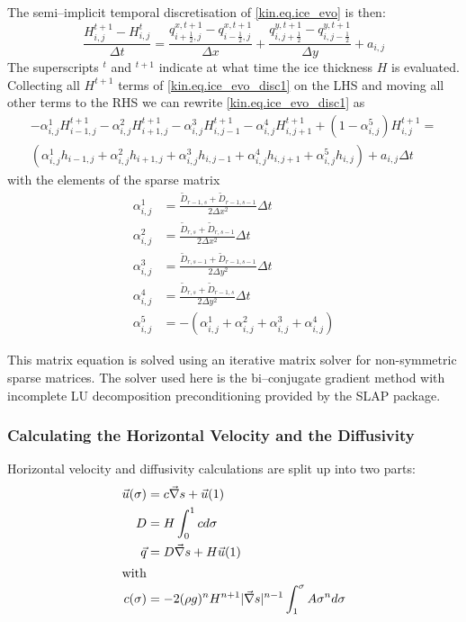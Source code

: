 The semi--implicit temporal discretisation of \eqref{kin.eq.ice_evo} is then:
\begin{equation}
\label{kin.eq.ice_evo_disc1}
  \frac{H^{t+1}_{i,j}-H^t_{i,j}}{\Delta t}=\frac{q^{x,t+1}_{i+\frac12,j}-q^{x,t+1}_{i-\frac12,j}}{\Delta x}+\frac{q^{y,t+1}_{i,j+\frac12}-q^{y,t+1}_{i,j-\frac12}}{\Delta y} + a_{i,j}
\end{equation}
The superscripts $^t$ and $^{t+1}$ indicate at what time the ice thickness $H$ is evaluated. Collecting all $H^{t+1}$ terms of \eqref{kin.eq.ice_evo_disc1} on the LHS and moving all other terms to the RHS we can rewrite \eqref{kin.eq.ice_evo_disc1} as
\begin{multline}
  -\alpha^1_{i,j}H^{t+1}_{i-1,j} - \alpha^2_{i,j}H^{t+1}_{i+1,j} - \alpha^3_{i,j}H^{t+1}_{i,j-1} - \alpha^4_{i,j}H^{t+1}_{i,j+1}+ (1-\alpha^5_{i,j})H^{t+1}_{i,j} = \\
  (\alpha^1_{i,j}h_{i-1,j} + \alpha^2_{i,j}h_{i+1,j} + \alpha^3_{i,j}h_{i,j-1} + \alpha^4_{i,j}h_{i,j+1}+ \alpha^5_{i,j}h_{i,j}) + a_{i,j}\Delta t
\end{multline}
with the elements of the sparse matrix
\begin{subequations}
  \begin{align}
    \alpha^1_{i,j} &=\frac{\tilde{D}_{r-1,s}+\tilde{D}_{r-1,s-1}}{2\Delta x^2}\Delta t\\
    \alpha^2_{i,j} &=\frac{\tilde{D}_{r,s}+\tilde{D}_{r,s-1}}{2\Delta x^2}\Delta t\\
    \alpha^3_{i,j} &=\frac{\tilde{D}_{r,s-1}+\tilde{D}_{r-1,s-1}}{2\Delta y^2}\Delta t\\
    \alpha^4_{i,j} &=\frac{\tilde{D}_{r,s}+\tilde{D}_{r-1,s}}{2\Delta y^2}\Delta t\\
    \alpha^5_{i,j} &=-(\alpha^1_{i,j}+\alpha^2_{i,j}+\alpha^3_{i,j}+\alpha^4_{i,j})
  \end{align}
\end{subequations}

This matrix equation is solved using an iterative matrix solver for non-symmetric sparse matrices. The solver used here is the bi--conjugate gradient method with incomplete LU decomposition preconditioning provided by the SLAP package.

\subsubsection{Calculating the Horizontal Velocity and the Diffusivity}
Horizontal velocity and diffusivity calculations are split up into two parts:
\begin{subequations}
  \begin{align}
    \vec u(\sigma)&=c\vec\nabla s+\vec u(1)\\
    D &=H\int_0^1cd\sigma\\
    \vec q&=D\vec\nabla s+H\vec u(1)\\
    \intertext{with}
    c(\sigma)&=-2(\rho g)^nH^{n+1}|\vec\nabla s|^{n-1}\int_1^\sigma A\sigma^nd\sigma
  \end{align}
\end{subequations}

